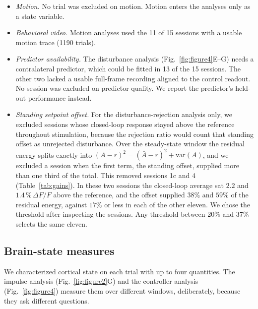 \begin{itemize}
\item \emph{Motion.}
No trial was excluded on motion.
Motion enters the analyses only as a state variable.
\item \emph{Behavioral video.}
Motion analyses used the 11 of 15 sessions with a usable motion trace (1190 trials).
\item \emph{Predictor availability.}
The disturbance analysis (Fig.~\ref{fig:figure4}E--G) needs a contralateral predictor, which could be fitted in 13 of the 15 sessions.
The other two lacked a usable full-frame recording aligned to the control readout.
No session was excluded on predictor quality.
We report the predictor's held-out performance instead.
\item \emph{Standing setpoint offset.}
For the disturbance-rejection analysis only, we excluded sessions whose closed-loop response stayed above the reference throughout stimulation, because the rejection ratio would count that standing offset as unrejected disturbance.
Over the steady-state window the residual energy splits exactly into $\overline{(A-r)^{2}} = (\bar{A}-r)^{2} + \mathrm{var}(A)$, and we excluded a session when the first term, the standing offset, supplied more than one third of the total.
This removed sessions 1c and 4 (Table~\ref{tab:gains}).
In these two sessions the closed-loop average sat $2.2$ and $1.4\,\%\,\Delta F/F$ above the reference, and the offset supplied $38\%$ and $59\%$ of the residual energy, against $17\%$ or less in each of the other eleven.
We chose the threshold after inspecting the sessions.
Any threshold between 20\% and 37\% selects the same eleven.
\end{itemize}

\subsection*{Brain-state measures}
\label{sec:disturbance}

We characterized cortical state on each trial with up to four quantities.
The impulse analysis (Fig.~\ref{fig:figure2}G) and the controller analysis (Fig.~\ref{fig:figure4}) measure them over different windows, deliberately, because they ask different questions.

